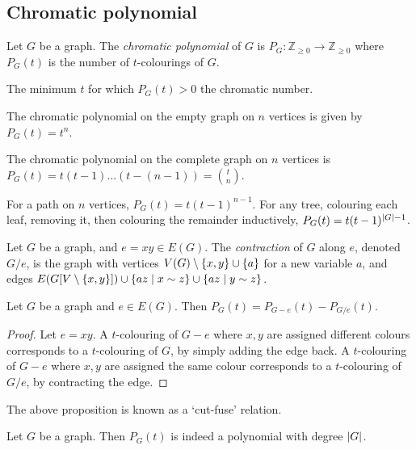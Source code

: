 \subsection{Chromatic polynomial}
\begin{definition}
	Let \( G \) be a graph.
	The \emph{chromatic polynomial} of \( G \) is \( P_G \colon \mathbb Z_{\geq 0} \to \mathbb Z_{\geq 0} \) where \( P_G(t) \) is the number of \( t \)-colourings of \( G \).
\end{definition}
\begin{remark}
	The minimum \( t \) for which \( P_G(t) > 0 \) the chromatic number.
\end{remark}
\begin{example}
	The chromatic polynomial on the empty graph on \( n \) vertices is given by \( P_G(t) = t^n \).

	The chromatic polynomial on the complete graph on \( n \) vertices is \( P_G(t) = t(t-1)\dots(t-(n-1)) = \binom t n \).

	For a path on \( n \) vertices, \( P_G(t) = t(t-1)^{n-1} \).
	For any tree, colouring each leaf, removing it, then colouring the remainder inductively, \( P_G(t) = t(t-1)^{\abs{G} - 1} \).
\end{example}
\begin{definition}
	Let \( G \) be a graph, and \( e = xy \in E(G) \).
	The \emph{contraction} of \( G \) along \( e \), denoted \( G / e \), is the graph with vertices \( V(G) \setminus \qty{x, y} \cup \qty{a} \) for a new variable \( a \), and edges \( E(G[V\setminus\qty{x,y}]) \cup \qty{az \mid x \sim z} \cup \qty{az \mid y \sim z} \).
\end{definition}
\begin{proposition}
	Let \( G \) be a graph and \( e \in E(G) \).
	Then \( P_G(t) = P_{G - e}(t) - P_{G/e}(t) \).
\end{proposition}
\begin{proof}
	Let \( e = xy \).
	A \( t \)-colouring of \( G - e \) where \( x, y \) are assigned different colours corresponds to a \( t \)-colouring of \( G \), by simply adding the edge back.
	A \( t \)-colouring of \( G - e \) where \( x, y \) are assigned the same colour corresponds to a \( t \)-colouring of \( G / e \), by contracting the edge.
\end{proof}
\begin{remark}
	The above proposition is known as a `cut-fuse' relation.
\end{remark}
\begin{proposition}
	Let \( G \) be a graph.
	Then \( P_G(t) \) is indeed a polynomial with degree \( \abs{G} \).
\end{proposition}
